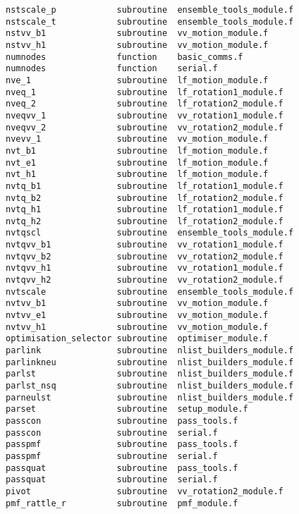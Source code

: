 \begin{verbatim}
nstscale_p            subroutine  ensemble_tools_module.f   
nstscale_t            subroutine  ensemble_tools_module.f   
nstvv_b1              subroutine  vv_motion_module.f        
nstvv_h1              subroutine  vv_motion_module.f        
numnodes              function    basic_comms.f             
numnodes              function    serial.f                  
nve_1                 subroutine  lf_motion_module.f        
nveq_1                subroutine  lf_rotation1_module.f     
nveq_2                subroutine  lf_rotation2_module.f     
nveqvv_1              subroutine  vv_rotation1_module.f     
nveqvv_2              subroutine  vv_rotation2_module.f     
nvevv_1               subroutine  vv_motion_module.f        
nvt_b1                subroutine  lf_motion_module.f        
nvt_e1                subroutine  lf_motion_module.f        
nvt_h1                subroutine  lf_motion_module.f        
nvtq_b1               subroutine  lf_rotation1_module.f     
nvtq_b2               subroutine  lf_rotation2_module.f     
nvtq_h1               subroutine  lf_rotation1_module.f     
nvtq_h2               subroutine  lf_rotation2_module.f     
nvtqscl               subroutine  ensemble_tools_module.f   
nvtqvv_b1             subroutine  vv_rotation1_module.f     
nvtqvv_b2             subroutine  vv_rotation2_module.f     
nvtqvv_h1             subroutine  vv_rotation1_module.f     
nvtqvv_h2             subroutine  vv_rotation2_module.f     
nvtscale              subroutine  ensemble_tools_module.f   
nvtvv_b1              subroutine  vv_motion_module.f        
nvtvv_e1              subroutine  vv_motion_module.f        
nvtvv_h1              subroutine  vv_motion_module.f        
optimisation_selector subroutine  optimiser_module.f        
parlink               subroutine  nlist_builders_module.f   
parlinkneu            subroutine  nlist_builders_module.f   
parlst                subroutine  nlist_builders_module.f   
parlst_nsq            subroutine  nlist_builders_module.f   
parneulst             subroutine  nlist_builders_module.f   
parset                subroutine  setup_module.f            
passcon               subroutine  pass_tools.f              
passcon               subroutine  serial.f                  
passpmf               subroutine  pass_tools.f              
passpmf               subroutine  serial.f                  
passquat              subroutine  pass_tools.f              
passquat              subroutine  serial.f                  
pivot                 subroutine  vv_rotation2_module.f     
pmf_rattle_r          subroutine  pmf_module.f              

\end{verbatim}
